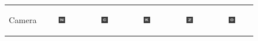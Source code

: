 
\begin{figure}[!t]
	\centering

	\begin{tabular}{@{}r@{ } c@{ } c@{ } c@{ } c@{ } c }

	\begin{sideways} \parbox[b]{20mm} {Camera} \end{sideways} &
	\includegraphics[width=0.185\textwidth]{__Images/05/BW_20-200_+2@90/bw_N_20-200_Camera+2,00D@90(lens).png} &
	\includegraphics[width=0.185\textwidth]{__Images/05/BW_20-200_+2@90/bw_C_20-200_Camera+2,00D@90(lens).png} &
	\includegraphics[width=0.185\textwidth]{__Images/05/BW_20-200_+2@90/bw_K_20-200_Camera+2,00D@90(lens).png} &
	\includegraphics[width=0.185\textwidth]{__Images/05/BW_20-200_+2@90/bw_Z_20-200_Camera+2,00D@90(lens).png} &
	\includegraphics[width=0.185\textwidth]{__Images/05/BW_20-200_+2@90/bw_O_20-200_Camera+2,00D@90(lens).png} \\


\end{tabular}
\end{figure}

